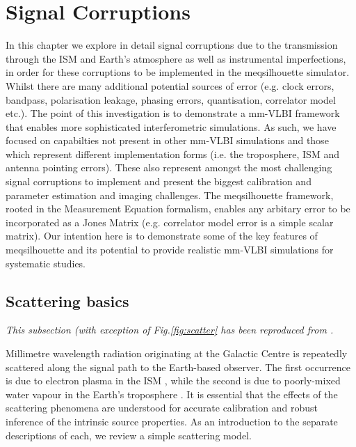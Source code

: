 \section{Signal Corruptions}
In this chapter we explore in detail signal corruptions due to the transmission through the ISM and Earth's atmosphere as well as instrumental imperfections, in order for these corruptions to be implemented in the {\sc meqsilhouette} simulator. 
Whilst there are many additional potential sources of error (e.g. clock errors, bandpass, polarisation leakage, phasing errors, quantisation, correlator model etc.). The point of this investigation is to demonstrate a mm-VLBI framework that enables more sophisticated interferometric simulations. As such, we have focused on capabilties not present in other mm-VLBI simulations and those which represent different implementation forms (i.e. the troposphere, ISM and antenna pointing errors). These also represent amongst the most challenging signal corruptions to implement and present the biggest calibration and parameter estimation and imaging challenges. The {\sc meqsilhouette} framework, rooted in the Measurement Equation formalism, enables any arbitary error to be incorporated as a Jones Matrix (e.g. correlator model error is a simple scalar matrix). Our intention here is to demonstrate some of the key features of {\sc meqsilhouette} and its potential to provide realistic mm-VLBI simulations for systematic studies.

\subsection{Scattering basics}\label{sec:basic_scat}

{\it This subsection (with exception of Fig.\ref{fig:scatter} has been reproduced from \citet{Blecher_2016}.}

Millimetre wavelength radiation originating at the Galactic Centre is repeatedly scattered along the signal path to the Earth-based observer. The first occurrence is due to electron plasma in the ISM \citep[e.g.][]{Bower_2006,Gwinn_2014}, while the second is due to poorly-mixed water vapour in the Earth's troposphere \citep*[e.g.][]{Lay_1997,Carilli_1999}. It is essential that the effects of the scattering phenomena are understood for accurate calibration and robust inference of the intrinsic source properties. As an introduction to the separate descriptions of each, we review a simple scattering model.

